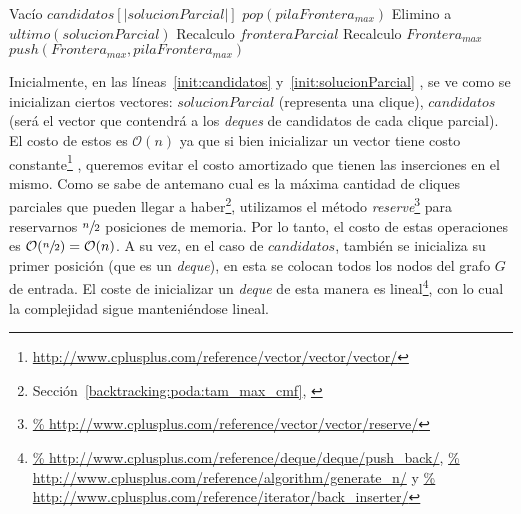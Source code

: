 \begin{pseudocodigo}
                \EndIf {}%
                \State Vac\'io $candidatos[|solucionParcial|]$ 
                 
                    \State $pop(pilaFrontera_{max})$ 
                    \State Elimino a $ultimo(solucionParcial)$ 
                    \State Recalculo $fronteraParcial$ 
                    \State Recalculo $Frontera_{max}$ 
                    \State $push(Frontera_{max},pilaFrontera_{max})$ 
                \EndIf {}
            \EndIf {}
        \EndWhile {}
    \EndIf {}%

    \State {} %
    \Statex
    \Statex {}
\end{pseudocodigo}

\bigskip

\par Inicialmente, en las l\'ineas~\ref{init:candidatos} y~\ref{init:solucionParcial} ,
    se ve como se inicializan ciertos vectores: $solucionParcial$ (representa una clique),
    $candidatos$ (ser\'a el vector que contendr\'a a los \emph{deques} de candidatos
    de cada clique parcial). El costo de estos es $\mathcal O(n)$ ya que si bien
    inicializar un vector tiene costo constante\footnote{\url{http://www.cplusplus.com/reference/vector/vector/vector/}}
    , queremos evitar el costo amortizado que tienen las inserciones en el mismo. Como
    se sabe de antemano cual es la m\'axima cantidad de cliques parciales que pueden llegar
    a haber\footnote{Secci\'on~\ref{backtracking:poda:tam_max_cmf},
    \emph{}},
    utilizamos el m\'etodo \emph{reserve}\footnote{\url{%
    http://www.cplusplus.com/reference/vector/vector/reserve/}} para reservarnos
    $\sfrac{n}{2}$ posiciones de memoria. Por lo tanto, el costo de estas operaciones
    es $\mathcal O(\sfrac{n}{2}) = \mathcal O(n)$. A su vez, en el caso de $candidatos$,
    tambi\'en se inicializa su primer posici\'on (que es un \emph{deque}), en esta
    se colocan todos los nodos del grafo $G$ de entrada. El coste de inicializar
    un \emph{deque} de esta manera es lineal\footnote{\url{%
    http://www.cplusplus.com/reference/deque/deque/push_back/}, \url{%
    http://www.cplusplus.com/reference/algorithm/generate_n/} y \url{%
    http://www.cplusplus.com/reference/iterator/back_inserter/}}, con lo cual la complejidad
    sigue manteni\'endose lineal.

